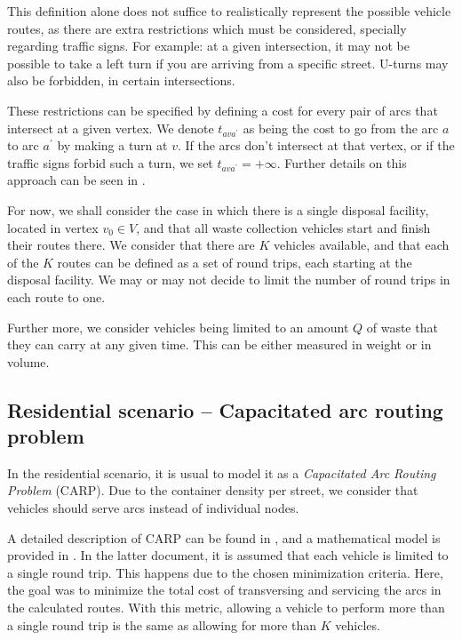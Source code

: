 This definition alone does not suffice to realistically represent the possible
vehicle routes, as there are extra restrictions which must be considered,
specially regarding traffic signs. For example: at a given intersection, it may
not be possible to take a left turn if you are arriving from a specific street.
U-turns may also be forbidden, in certain intersections. 

These restrictions can be specified by defining a cost for every pair of arcs
that intersect at a given vertex.  We denote $t_{ava^\prime}$ as being the
cost to go from the arc $a$ to arc $a^\prime$ by making a turn at $v$. If the
arcs don't intersect at that vertex, or if the traffic signs forbid such a
turn, we set $t_{ava^\prime} = +\infty$. Further details on this approach can
be seen in \citet{Corberan2002887}.

For now, we shall consider the case in which there is a single disposal
facility, located in vertex $v_0 \in V$, and that all waste collection vehicles
start and finish their routes there. We consider that there are $K$ vehicles
available, and that each of the $K$ routes can be defined as a set of round
trips, each starting at the disposal facility. We may or may not decide to
limit the number of round trips in each route to one.

Further more, we consider vehicles being limited to an amount $Q$ of waste that
they can carry at any given time. This can be either measured in weight or in
volume.

\subsection{Residential scenario -- Capacitated arc routing problem}

In the residential scenario, it is usual to model it as a \textit{Capacitated Arc
Routing Problem} (CARP). Due to the container density per street, we consider
that vehicles should serve arcs instead of individual nodes.

A detailed description of CARP can be found in \citet{Sniezek01}, and a
mathematical model is provided in \citet{Belenguer98}. In the latter document,
it is assumed that each vehicle is limited to a single round trip. This happens
due to the chosen minimization criteria. Here, the goal was to minimize the
total cost of transversing and servicing the arcs in the calculated routes.
With this metric, allowing a vehicle to perform more than a single round trip
is the same as allowing for more than $K$ vehicles.

